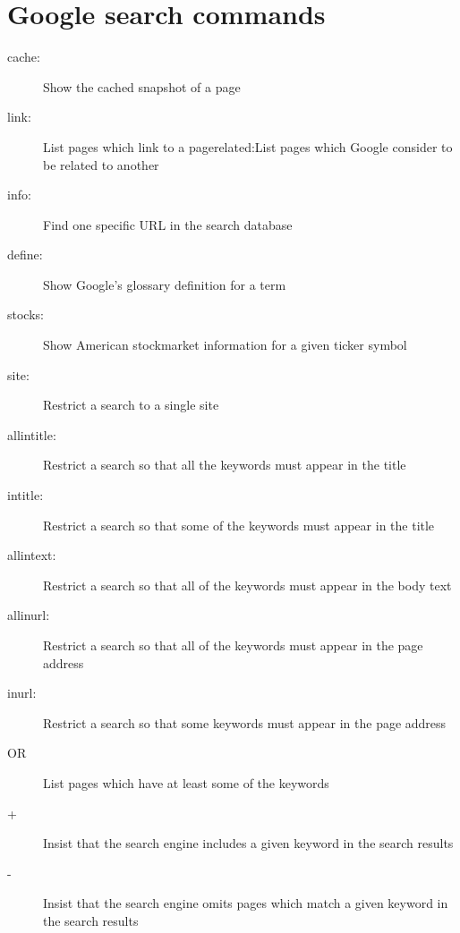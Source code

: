 \documentclass[letterpaper,10pt,english]{sphinxmanual}
\begin{document}
\section{Google search commands}
\label{_source/things/google_search_commands:google-search-commands}\label{_source/things/google_search_commands::doc}\begin{description}
\item[{cache:}] \leavevmode
Show the cached snapshot of a page

\item[{link:}] \leavevmode
List pages which link to a pagerelated:List pages which Google consider to be related to another

\item[{info:}] \leavevmode
Find one specific URL in the search database

\item[{define:}] \leavevmode
Show Google's glossary definition for a term

\item[{stocks:}] \leavevmode
Show American stockmarket information for a given ticker symbol

\item[{site:}] \leavevmode
Restrict a search to a single site

\item[{allintitle:}] \leavevmode
Restrict a search so that all the keywords must appear in the title

\item[{intitle:}] \leavevmode
Restrict a search so that some of the keywords must appear in the title

\item[{allintext:}] \leavevmode
Restrict a search so that all of the keywords must appear in the body text

\item[{allinurl:}] \leavevmode
Restrict a search so that all of the keywords must appear in the page address

\item[{inurl:}] \leavevmode
Restrict a search so that some keywords must appear in the page address

\item[{OR}] \leavevmode
List pages which have at least some of the keywords

\item[{+}] \leavevmode
Insist that the search engine includes a given keyword in the search results

\item[{-}] \leavevmode
Insist that the search engine omits pages which match a given keyword in the search results

\end{description}
\end{document}
